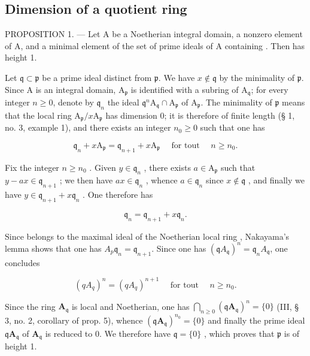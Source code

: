 \subsection{Dimension of a quotient ring}

PROPOSITION 1. --- Let A be a Noetherian integral domain,  a nonzero element of A, and  a minimal element of the set of prime ideals of A containing . Then  has height 1.

Let \(\mathfrak{q} \subset \mathfrak{p}\) be a prime ideal distinct from \(\mathfrak{p}\). We have \(x \notin \mathfrak{q}\) by the minimality of \(\mathfrak{p}\). Since A is an integral domain, \(\mathrm{A}_{\mathfrak{p}}\) is identified with a subring of \(\mathrm{A}_{\mathfrak{q}}\); for every integer \(n \geqslant 0\), denote by \(\mathfrak{q}_n\) the ideal \(\mathfrak{q}^n\mathrm{A}_{\mathfrak{q}} \cap \mathrm{A}_{\mathfrak{p}}\) of \(\mathrm{A}_{\mathfrak{p}}\). The minimality of \(\mathfrak{p}\) means that the local ring \(\mathrm{A}_{\mathfrak{p}} / x\mathrm{A}_{\mathfrak{p}}\) has dimension 0; it is therefore of finite length (§ 1, no. 3, example 1), and there exists an integer \(n_0 \geqslant 0\) such that one has

\[
\mathfrak {q} _ {n} + x \mathrm{A} _ {\mathfrak {p}} = \mathfrak {q} _ {n + 1} + x \mathrm{A} _ {\mathfrak {p}} \quad \text { for   tout } \quad n \geqslant n _ {0}.\tag{1}
\]

Fix the integer \(n \geqslant n_{0}\) . Given \(y \in \mathfrak{q}_{n}\) , there exists \(a \in \mathrm{A}_{\mathfrak{p}}\) such that \(y - ax \in \mathfrak{q}_{n+1}\) ; we then have \(ax \in \mathfrak{q}_{n}\) , whence \(a \in \mathfrak{q}_{n}\) since \(x \notin \mathfrak{q}\) , and finally we have \(y \in \mathfrak{q}_{n+1} + x\mathfrak{q}_{n}\) . One therefore has

\[
\mathfrak {q} _ {n} = \mathfrak {q} _ {n + 1} + x \mathfrak {q} _ {n}.\tag{2}
\]

Since  belongs to the maximal ideal of the Noetherian local ring , Nakayama's lemma shows that one has \(A_{p}\)\(\mathfrak{q}_n = \mathfrak{q}_{n+1}\). Since one has \((\mathfrak{q}A_{\mathfrak{q}})^{n} = \mathfrak{q}_{n}A_{\mathfrak{q}}\), one concludes

\[
(q A _ {q}) ^ {n} = (q A _ {q}) ^ {n + 1} \quad \text { for   tout } \quad n \geqslant n _ {0}.\tag{3}
\]

Since the ring \(\mathbf{A}_{\mathfrak{q}}\) is local and Noetherian, one has \(\bigcap_{n\geqslant 0}(\mathfrak{q}\mathbf{A}_{\mathfrak{q}})^n = \{0\}\) (III, § 3, no. 2, corollary of prop. 5), whence \((\mathfrak{q}\mathbf{A}_{\mathfrak{q}})^{n_0} = \{0\}\) and finally the prime ideal \(\mathfrak{q}\mathbf{A}_{\mathfrak{q}}\) of \(\mathbf{A}_{\mathfrak{q}}\) is reduced to 0. We therefore have \(\mathfrak{q} = \{0\}\) , which proves that \(\mathfrak{p}\) is of height 1.

